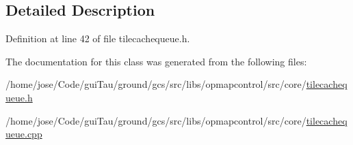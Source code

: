 \subsection{Detailed Description}


Definition at line 42 of file tilecachequeue.\-h.



The documentation for this class was generated from the following files\-:\begin{DoxyCompactItemize}
\item 
/home/jose/\-Code/gui\-Tau/ground/gcs/src/libs/opmapcontrol/src/core/\hyperlink{tilecachequeue_8h}{tilecachequeue.\-h}\item 
/home/jose/\-Code/gui\-Tau/ground/gcs/src/libs/opmapcontrol/src/core/\hyperlink{tilecachequeue_8cpp}{tilecachequeue.\-cpp}\end{DoxyCompactItemize}
